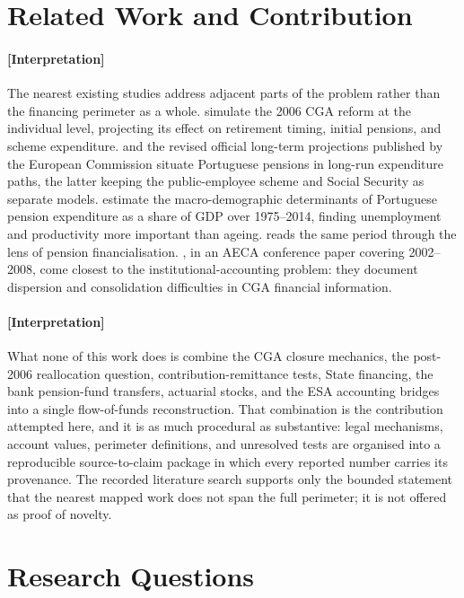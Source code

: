 \documentclass[11pt]{article}
\begin{document}
\section{Related Work and Contribution}
\label{sec:related}
\paragraph{[Interpretation]}
The nearest existing studies address adjacent parts of the problem rather than the financing perimeter as a whole. \citet{campos_pereira_2008_cga_reform} simulate the 2006 CGA reform at the individual level, projecting its effect on retirement timing, initial pensions, and scheme expenditure. \citet{pereira_rodrigues_2001_ageing} and the revised official long-term projections published by the European Commission \citep{revised_projections_2006} situate Portuguese pensions in long-run expenditure paths, the latter keeping the public-employee scheme and Social Security as separate models. \citet{garcia_silva_2023_determinants} estimate the macro-demographic determinants of Portuguese pension expenditure as a share of GDP over 1975--2014, finding unemployment and productivity more important than ageing. \citet{financialisation_portugal_pensions} reads the same period through the lens of pension financialisation. \citet{abreu_david_cga_financial_analysis}, in an AECA conference paper covering 2002--2008, come closest to the institutional-accounting problem: they document dispersion and consolidation difficulties in CGA financial information.

\paragraph{[Interpretation]}
What none of this work does is combine the CGA closure mechanics, the post-2006 reallocation question, contribution-remittance tests, State financing, the bank pension-fund transfers, actuarial stocks, and the ESA accounting bridges into a single flow-of-funds reconstruction. That combination is the contribution attempted here, and it is as much procedural as substantive: legal mechanisms, account values, perimeter definitions, and unresolved tests are organised into a reproducible source-to-claim package in which every reported number carries its provenance. The recorded literature search supports only the bounded statement that the nearest mapped work does not span the full perimeter; it is not offered as proof of novelty.

\section{Research Questions}
\label{sec:questions}
\end{document}
